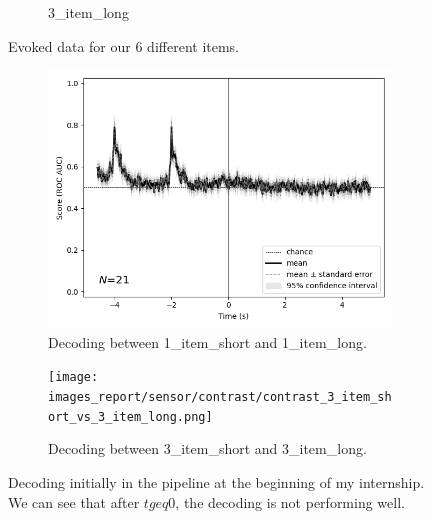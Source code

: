 \begin{figure}[htb]
\begin{subfigure}{0.25\textwidth}
        \caption{3\_item\_long}
        \label{fig:3_item_long}
    \end{subfigure}
    \caption[Evoked data for our 6 different items.]%
    {Evoked data for our 6 different items.}
    \label{fig:Evoked_data}
\end{figure}


\begin{figure}
    \centering
    \begin{subfigure}{.5\textwidth}
        \centering
        \includegraphics[width=1.\linewidth]{images_report/sensor/contrast/contrast_1_item_short_vs_1_item_long.png}
        \caption{Decoding between 1\_item\_short and 1\_item\_long.}
        \label{fig:decoding_1_item}
    \end{subfigure}%
    \begin{subfigure}{.5\textwidth}
        \centering
        \texttt{[image: images\_report/sensor/contrast/contrast\_3\_item\_short\_vs\_3\_item\_long.png]}
        \caption{Decoding between 3\_item\_short and 3\_item\_long.}
        \label{fig:decoding_3_item}
    \end{subfigure}
    \caption{Decoding initially in the pipeline at the beginning of my internship. We can see that after $t geq 0$, the decoding is not performing well.}
    \label{fig:decoding_initial}
\end{figure}


